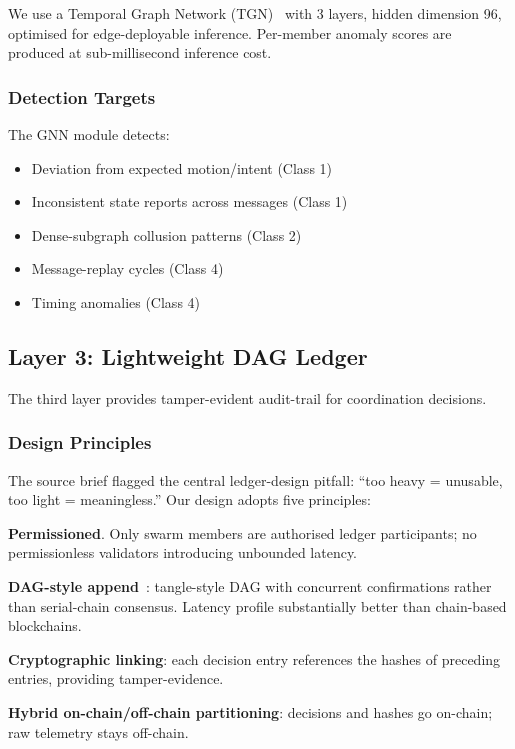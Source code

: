 \documentclass[sigconf,nonacm]{acmart}
\begin{document}
We use a Temporal Graph Network (TGN)~\cite{rossi2020tgn} with 3
layers, hidden dimension 96, optimised for edge-deployable
inference. Per-member anomaly scores are produced at sub-millisecond
inference cost.

\subsubsection{Detection Targets}

The GNN module detects:
\begin{itemize}
  \item Deviation from expected motion/intent (Class 1)
  \item Inconsistent state reports across messages (Class 1)
  \item Dense-subgraph collusion patterns (Class 2)
  \item Message-replay cycles (Class 4)
  \item Timing anomalies (Class 4)
\end{itemize}

\subsection{Layer 3: Lightweight DAG Ledger}

The third layer provides tamper-evident audit-trail for
coordination decisions.

\subsubsection{Design Principles}

The source brief flagged the central ledger-design pitfall:
``too heavy = unusable, too light = meaningless.'' Our design
adopts five principles:

\textbf{Permissioned}. Only swarm members are authorised
ledger participants; no permissionless validators introducing
unbounded latency.

\textbf{DAG-style append}~\cite{popov2018iota}: tangle-style
DAG with concurrent confirmations rather than serial-chain
consensus. Latency profile substantially better than
chain-based blockchains.

\textbf{Cryptographic linking}: each decision entry references
the hashes of preceding entries, providing tamper-evidence.

\textbf{Hybrid on-chain/off-chain partitioning}: decisions and
hashes go on-chain; raw telemetry stays off-chain.
\end{document}
